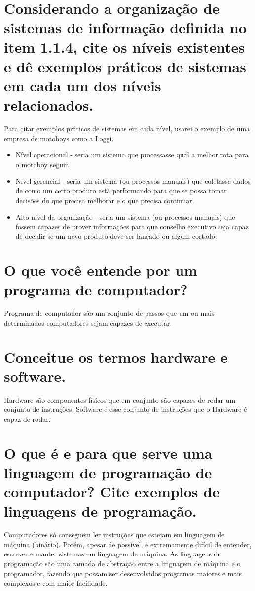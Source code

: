 \documentclass[11pt]{article}
\begin{document}
\section{Considerando a organização de sistemas de informação definida no item 1.1.4, cite os níveis existentes e dê exemplos práticos de sistemas em cada um dos níveis relacionados.}
\label{sec:orgb064478}
Para citar exemplos práticos de sistemas em cada nível, usarei o exemplo de uma
empresa de motoboys como a Loggi.
\begin{itemize}
\item Nível operacional - seria um sistema que processasse qual a melhor rota para o
motoboy seguir.
\item Nível gerencial - seria um sistema (ou processos manuais) que coletasse dados
de como um certo produto está performando para que se possa tomar decisões do
que precisa melhorar e o que precisa continuar.
\item Alto nível da organização - seria um sistema (ou processos manuais) que fossem
capazes de prover informações para que conselho executivo seja capaz de
decidir se um novo produto deve ser lançado ou algum cortado.
\end{itemize}
\section{O que você entende por um programa de computador?}
\label{sec:org45da52c}
Programa de computador são um conjunto de passos que um ou mais determinados
computadores sejam capazes de executar.
\section{Conceitue os termos hardware e software.}
\label{sec:orgbebb7db}
Hardware são componentes físicos que em conjunto são capazes de rodar um
conjunto de instruções. Software é esse conjunto de instruções que o Hardware é
capaz de rodar.
\section{O que é e para que serve uma linguagem de programação de computador? Cite exemplos de linguagens de programação.}
\label{sec:org12bb7d6}
Computadores só conseguem ler instruções que estejam em linguagem de máquina
(binário). Porém, apesar de possível, é extremamente difícil de entender,
escrever e manter sistemas em linguagem de máquina. As linguagens de programação
são uma camada de abstração entre a linguagem de máquina e o programador,
fazendo que possam ser desenvolvidos programas maiores e mais complexos e com
maior facilidade.
\end{document}
